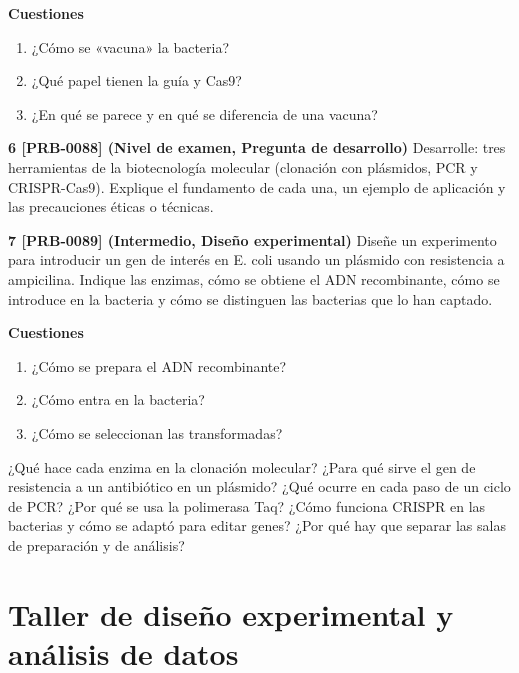 \documentclass{book}
\begin{document}
\begin{tcolorbox}[title={Ejercicios}, studiumworked, breakable]
\noindent\textbf{Cuestiones}
\begin{enumerate}
\item ¿Cómo se «vacuna» la bacteria?
\item ¿Qué papel tienen la guía y Cas9?
\item ¿En qué se parece y en qué se diferencia de una vacuna?
\end{enumerate}

\noindent\textbf{6 [PRB-0088] (Nivel de examen, Pregunta de desarrollo)}
Desarrolle: tres herramientas de la biotecnología molecular (clonación con plásmidos, PCR y CRISPR-Cas9). Explique el fundamento de cada una, un ejemplo de aplicación y las precauciones éticas o técnicas.


\noindent\textbf{7 [PRB-0089] (Intermedio, Diseño experimental)}
Diseñe un experimento para introducir un gen de interés en E. coli usando un plásmido con resistencia a ampicilina. Indique las enzimas, cómo se obtiene el ADN recombinante, cómo se introduce en la bacteria y cómo se distinguen las bacterias que lo han captado.


\noindent\textbf{Cuestiones}
\begin{enumerate}
\item ¿Cómo se prepara el ADN recombinante?
\item ¿Cómo entra en la bacteria?
\item ¿Cómo se seleccionan las transformadas?
\end{enumerate}
\end{tcolorbox}

\begin{tcolorbox}[title={Autoficha}, studiumcheck, breakable]

¿Qué hace cada enzima en la clonación molecular? ¿Para qué sirve el gen de resistencia a un antibiótico en un plásmido? ¿Qué ocurre en cada paso de un ciclo de PCR? ¿Por qué se usa la polimerasa Taq? ¿Cómo funciona CRISPR en las bacterias y cómo se adaptó para editar genes? ¿Por qué hay que separar las salas de preparación y de análisis?

\end{tcolorbox}

\chapter{Taller de diseño experimental y análisis de datos}
\label{chap:bio-12}
\end{document}
